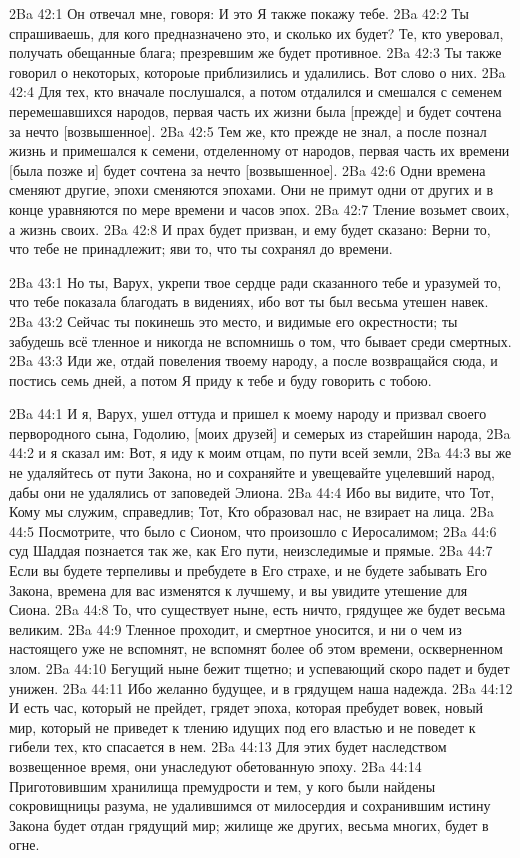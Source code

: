\vs 2Ba 42:1
Он отвечал мне, говоря: И это Я также покажу тебе.
\vs 2Ba 42:2
Ты спрашиваешь, для кого предназначено это, и сколько их будет? Те, кто уверовал, получать обещанные блага; презревшим же будет противное.
\vs 2Ba 42:3
Ты также говорил о некоторых, котороые приблизились и удалились. Вот слово о них.
\vs 2Ba 42:4
Для тех, кто вначале послушался, а потом отдалился и смешался с семенем перемешавшихся народов, первая часть их жизни была [прежде] и будет сочтена за нечто [возвышенное].
\vs 2Ba 42:5
Тем же, кто прежде не знал, а после познал жизнь и примешался к семени, отделенному от народов, первая часть их времени [была позже и] будет сочтена за нечто [возвышенное].
\vs 2Ba 42:6
Одни времена сменяют другие, эпохи сменяются эпохами. Они не примут одни от других и в конце уравняются по мере времени и часов эпох.
\vs 2Ba 42:7
Тление возьмет своих, а жизнь своих.
\vs 2Ba 42:8
И прах будет призван, и ему будет сказано: Верни то, что тебе не принадлежит; яви то, что ты сохранял до времени.

\vs 2Ba 43:1
Но ты, Варух, укрепи твое сердце ради сказанного тебе и уразумей то, что тебе показала благодать в видениях, ибо вот ты был весьма утешен навек.
\vs 2Ba 43:2
Сейчас ты покинешь это место, и видимые его окрестности; ты забудешь всё тленное и никогда не вспомнишь о том, что бывает среди смертных.
\vs 2Ba 43:3
Иди же, отдай повеления твоему народу, а после возвращайся сюда, и постись семь дней, а потом Я приду к тебе и буду говорить с тобою.

\vs 2Ba 44:1
И я, Варух, ушел оттуда и пришел к моему народу и призвал своего первородного сына, Годолию, [моих друзей] и семерых из старейшин народа,
\vs 2Ba 44:2
и я сказал им: Вот, я иду к моим отцам, по пути всей земли,
\vs 2Ba 44:3
вы же не удаляйтесь от пути Закона, но и сохраняйте и увещевайте уцелевший народ, дабы они не удалялись от заповедей Элиона.
\vs 2Ba 44:4
Ибо вы видите, что Тот, Кому мы служим, справедлив; Тот, Кто образовал нас, не взирает на лица.
\vs 2Ba 44:5
Посмотрите, что было с Сионом, что произошло с Иеросалимом;
\vs 2Ba 44:6
суд Шаддая познается так же, как Его пути, неизследимые и прямые.
\vs 2Ba 44:7
Если вы будете терпеливы и пребудете в Его страхе, и не будете забывать Его Закона, времена для вас изменятся к лучшему, и вы увидите утешение для Сиона.
\vs 2Ba 44:8
То, что существует ныне, есть ничто, грядущее же будет весьма великим.
\vs 2Ba 44:9
Тленное проходит, и смертное уносится, и ни о чем из настоящего уже не вспомнят, не вспомнят более об этом времени, оскверненном злом.
\vs 2Ba 44:10
Бегущий ныне бежит тщетно; и успевающий скоро падет и будет унижен.
\vs 2Ba 44:11
Ибо желанно будущее, и в грядущем наша надежда.
\vs 2Ba 44:12
И есть час, который не прейдет, грядет эпоха, которая пребудет вовек, новый мир, который не приведет к тлению идущих под его властью и не поведет к гибели тех, кто спасается в нем.
\vs 2Ba 44:13
Для этих будет наследством возвещенное время, они унаследуют обетованную эпоху.
\vs 2Ba 44:14
Приготовившим хранилища премудрости и тем, у кого были найдены сокровищницы разума, не удалившимся от милосердия и сохранившим истину Закона будет отдан грядущий мир; жилище же других, весьма многих, будет в огне.

